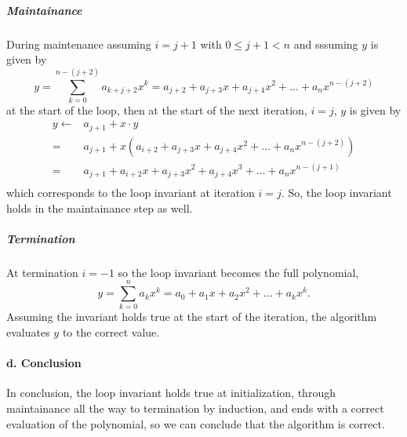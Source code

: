 \documentclass{article}
\begin{document}
\subparagraph{Maintainance} During maintenance assuming $i = j+1$ with $0\leq j+1<n$ and sssuming $y$ is given by
\[
y = \sum_{k=0}^{n-(j+2)}a_{k+j+2}x^k = a_{j+2} + a_{j+3}x + a_{j+4}x^2 + \ldots + a_nx^{n-(j+2)}
\]
at the start of the loop, then at the start of the next iteration, $i=j$, $y$ is given by
\begin{equation*}
\begin{split}
y \gets & a_{j+1} + x\cdot y \\
      = & a_{j+1} + x\left(a_{i+2} + a_{j+3}x + a_{j+4}x^2 + \ldots + a_nx^{n-(j+2)} \right)\\
      = & a_{j+1} + a_{i+2}x + a_{j+3}x^2 + a_{j+4}x^3 + \ldots + a_nx^{n-(j+1)}\\
\end{split}
\end{equation*}
which corresponds to the loop invariant at iteration $i=j$. So, the loop invariant holds in the maintainance step as well.

\subparagraph{Termination}
At termination $i=-1$ so the loop invariant becomes the full polynomial,
\[
y = \sum_{k=0}^{n}a_kx^k = a_0 + a_1x + a_2x^2 + \ldots + a_kx^k.
\]
Assuming the invariant holds true at the start of the iteration, the algorithm evaluates $y$ to the correct value.

\paragraph{d. Conclusion}
In conclusion, the loop invariant holds true at initialization, through maintainance all the way to termination by induction, and ends with a correct evaluation of the polynomial, so we can conclude that the algorithm is correct. 
\end{document}
